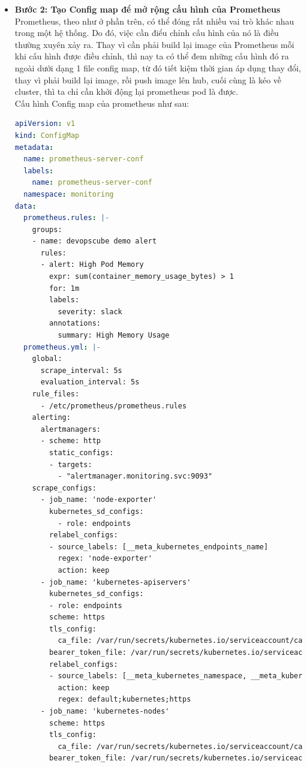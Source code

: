 \begin{itemize}
\begin{lstlisting}[language=yaml]
  \end{lstlisting}
  \item \textbf{Bước 2: Tạo Config map để mở rộng cấu hình của Prometheus}\\[0.2cm]
  Prometheus, theo như ở phần trên, có thể đóng rất nhiều vai trò khác nhau trong một hệ thống. Do đó, việc cần điểu chỉnh cấu hình của nó là điều thường xuyên xảy ra. Thay vì cần phải build lại image của Prometheus mỗi khi cấu hình được điều chỉnh, thì nay ta có thể đem những cấu hình đó ra ngoài dưới dạng 1 file config map, từ đó tiết kiệm thời gian áp dụng thay đổi, thay vì phải build lại image, rồi push image lên hub, cuối cùng là kéo về cluster, thì ta chỉ cần khởi động lại prometheus pod là được.\\[0.2cm]
  Cấu hình Config map của prometheus như sau:
  \begin{lstlisting}[language=yaml]
apiVersion: v1
kind: ConfigMap
metadata:
  name: prometheus-server-conf
  labels:
    name: prometheus-server-conf
  namespace: monitoring
data:
  prometheus.rules: |-
    groups:
    - name: devopscube demo alert
      rules:
      - alert: High Pod Memory
        expr: sum(container_memory_usage_bytes) > 1
        for: 1m
        labels:
          severity: slack
        annotations:
          summary: High Memory Usage
  prometheus.yml: |-
    global:
      scrape_interval: 5s
      evaluation_interval: 5s
    rule_files:
      - /etc/prometheus/prometheus.rules
    alerting:
      alertmanagers:
      - scheme: http
        static_configs:
        - targets:
          - "alertmanager.monitoring.svc:9093"
    scrape_configs:
      - job_name: 'node-exporter'
        kubernetes_sd_configs:
          - role: endpoints
        relabel_configs:
        - source_labels: [__meta_kubernetes_endpoints_name]
          regex: 'node-exporter'
          action: keep
      - job_name: 'kubernetes-apiservers'
        kubernetes_sd_configs:
        - role: endpoints
        scheme: https
        tls_config:
          ca_file: /var/run/secrets/kubernetes.io/serviceaccount/ca.crt
        bearer_token_file: /var/run/secrets/kubernetes.io/serviceaccount/token
        relabel_configs:
        - source_labels: [__meta_kubernetes_namespace, __meta_kubernetes_service_name, __meta_kubernetes_endpoint_port_name]
          action: keep
          regex: default;kubernetes;https
      - job_name: 'kubernetes-nodes'
        scheme: https
        tls_config:
          ca_file: /var/run/secrets/kubernetes.io/serviceaccount/ca.crt
        bearer_token_file: /var/run/secrets/kubernetes.io/serviceaccount/token

\end{lstlisting}
\end{itemize}
